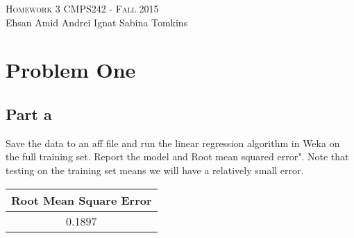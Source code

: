\documentclass{article}
\begin{document}
\begin{center}
\Huge{\textsc{Homework 3}} 
\Large\textsc{CMPS242 - Fall 2015}\\

\large{Ehsan Amid \hfill Andrei Ignat  \hfill Sabina Tomkins} 
\end{center}

\section{Problem One}
\subsection{Part a}
Save the data to an aff file and run the linear regression algorithm in Weka on the full training set. Report the model and Root mean squared error". Note that testing on the training set means we will have a relatively small error.

\begin{table}[htbp]
    \centering
  
    \begin{tabular}{|c|}
    \hline
        Root Mean Square Error \\ 
            \hline
         0.1897\\
             \hline
      
    \end{tabular}
\end{table}
\end{document}
